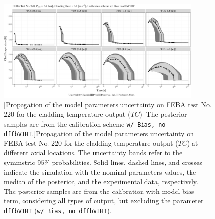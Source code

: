 \clearpage
\begin{figure}
	\centering
	\includegraphics[width=0.90\textwidth]{../figures/chapter5/figures/plotTraceUQPosteriorAllDiscCenteredNoParam8TC220}
		[Propagation of the model parameters uncertainty on FEBA test No. $220$ for the cladding temperature output ($TC$). The posterior samples are from the calibration scheme \texttt{w/ Bias, no dffbVIHT}.]{Propagation of the model parameters uncertainty on FEBA test No. $220$ for the cladding temperature output ($TC$) at different axial locations. The uncertainty bands refer to the symmetric $95\%$ probabilities. Solid lines, dashed lines, and crosses indicate the simulation with the nominal parameters values, the median of the posterior, and the experimental data, respectively. The posterior samples are from the calibration with model bias term, considering all types of output, but excluding the parameter \texttt{dffbVIHT} (\texttt{w/ Bias, no dffbVIHT}).}
	\label{fig:ch5_plot_trace_uq_post_tc_220_noparam8}
\end{figure}
\clearpage

